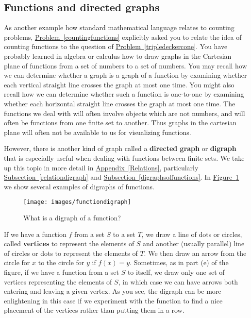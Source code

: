 \documentclass[10pt,]{book}
\newcommand{\terminology}[1]{\textbf{#1}}
\theoremstyle{plain}
\theoremstyle{definition}
\theoremstyle{definition}
\numberwithin{equation}{chapter}
\begin{document}
\subsection[{Functions and directed graphs}]{Functions and directed graphs}\label{subsection-2}
\hypertarget{p-126}{}%
As another example how standard mathematical language relates to counting problems, \hyperref[countingfunctions]{Problem~\ref{countingfunctions}} explicitly asked you to relate the idea of counting functions to the question of \hyperref[tripledeckercone]{Problem~\ref{tripledeckercone}}. You have probably learned in algebra or calculus how to draw graphs in the Cartesian plane of functions from a set of numbers to a set of numbers. You may recall how we can determine whether a graph is a graph of a function by examining whether each vertical straight line crosses the graph at most one time. You might also recall how we can determine whether such a function is one-to-one by examining whether each horizontal straight line crosses the graph at most one time. The functions we deal with will often involve objects which are not numbers, and will often be functions from one finite set to another. Thus graphs in the cartesian plane will often not be available to us for visualizing functions.%
\par
\hypertarget{p-127}{}%
However, there is another kind of graph called a \terminology{directed graph} or \terminology{digraph} that is especially useful when dealing with functions between finite sets. We take up this topic in more detail in \hyperref[Relations]{Appendix~\ref{Relations}}, particularly \hyperref[relationdigraph]{Subsection~\ref{relationdigraph}} and \hyperref[digraphsoffunctions]{Subsection~\ref{digraphsoffunctions}}. In \hyperref[functiondigraphs]{Figure~\ref{functiondigraphs}} we show several examples of digraphs of functions.%
\begin{figure}
\centering
\texttt{[image: images/functiondigraph]}
\caption{What is a digraph of a function?\label{functiondigraphs}}
\end{figure}
\hypertarget{p-128}{}%
If we have a function \(f\) from a set \(S\) to a set \(T\), we draw a line of dots or circles, called \terminology{vertices} to represent the elements of \(S\) and another (usually parallel) line of circles or dots to represent the elements of \(T\). We then draw an arrow from the circle for \(x\) to the circle for \(y\) if \(f(x) = y\). Sometimes, as in part (e) of the figure, if we have a function from a set \(S\) to itself, we draw only one set of vertices representing the elements of \(S\), in which case we can have arrows both entering and leaving a given vertex. As you see, the digraph can be more enlightening in this case if we experiment with the function to find a nice placement of the vertices rather than putting them in a row.%
\end{document}
